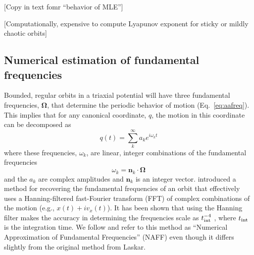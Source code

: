 \documentclass[letterpaper,12pt,preprint]{aastex}
\newcommand{\bs}[1]{\boldsymbol{#1}}
\newcommand{\inttime}{t_{\rm int}}
\begin{document}
[Copy in text fomr ``behavior of MLE'']

[Computationally, expensive to compute Lyapunov exponent for sticky or mildly chaotic orbits]

\subsection{Numerical estimation of fundamental frequencies}

Bounded, regular orbits in a triaxial potential will have three fundamental frequencies, $\bs{\Omega}$, that determine the periodic behavior of motion (Eq.~\ref{eq:aafreq}). This implies that for any canonical coordinate, $q$, the motion in this coordinate can be decomposed as 
\begin{equation}
	q(t) = \sum^\infty_k a_k e^{i \omega_k t}
\end{equation}
where these frequencies, $\omega_k$, are linear, integer combinations of the fundamental frequencies
\begin{equation}
	\omega_k = \bs{n}_k \cdot \bs{\Omega}
\end{equation}
and the $a_k$ are complex amplitudes and $\bs{n}_k$ is an integer vector. \cite{laskar93} introduced a method for recovering the fundamental frequencies of an orbit that effectively uses a Hanning-filtered fast-Fourier transform (FFT) of complex combinations of the motion (e.g., $x(t) + i v_x(t)$). It has been shown that using the Hanning filter makes the accuracy in determining the frequencies scale as $\inttime^{-4}$ \citep{laskar99}, where $\inttime$ is the integration time. We follow \cite{valluri98} and refer to this method as ``Numerical Approximation of Fundamental Frequencies'' (NAFF) even though it differs slightly from the original method from Laskar.
\end{document}
